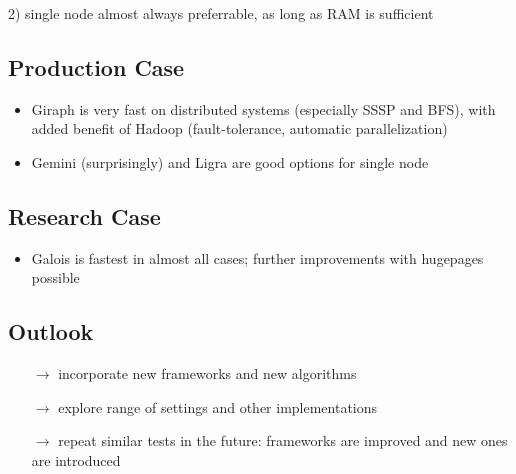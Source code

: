 \documentclass{meetings}
\begin{document}
2) single node almost always preferrable, as long as RAM is sufficient
\begin{multicols}{2}
	\subsection{Production Case}
	\begin{itemize}
		\item Giraph is very fast on distributed systems (especially SSSP and BFS), with added benefit of Hadoop (fault-tolerance, automatic parallelization) 
		\item Gemini (surprisingly) and Ligra are good options for single node 
	\end{itemize}

	\columnbreak
	\subsection{Research Case}
	\begin{itemize}
		\item Galois is fastest in almost all cases; further improvements with hugepages possible
	\end{itemize}
\end{multicols}


\subsection{Outlook}
\begin{itemize}
	\item[$\rightarrow$] incorporate new frameworks and new algorithms
	\item[$\rightarrow$] explore range of settings and other implementations
	\item[$\rightarrow$] repeat similar tests in the future: frameworks are improved and new ones are introduced
\end{itemize}
\end{document}
